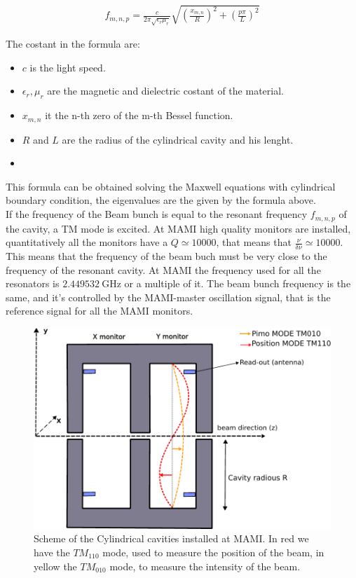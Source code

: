 \begin{align*}
f_{m,n,p} = \frac{c}{2\pi \sqrt{\epsilon_{r} \mu_{r}}} \sqrt{(\frac{x_{m,n}}{R})^{2} + (\frac{p \pi}{L})^{2}}
\end{align*}

The costant in the formula are:

\begin{itemize}
\item $c$ is the light speed.
\item $\epsilon_{r}, \mu_{r}$ are the magnetic and dielectric costant of the material.
\item $x_{m,n}$ it the n-th zero of the m-th Bessel function.
\item $R$ and $L$ are the radius of the cylindrical cavity and his lenght.
\item {}
\end{itemize}

This formula can be obtained solving the Maxwell equations with cylindrical boundary condition, the eigenvalues are the given by the formula above. \\
If the frequency of the Beam bunch is equal to the resonant frequency $f_{m,n,p}$ of the cavity, a TM mode is excited. At MAMI high quality monitors are installed, quantitatively all the monitors have a $Q \simeq 10000$, that means that $\frac{\nu}{\delta \nu} \simeq 10000$. This means that the frequency of the beam buch must be very close to the frequency of the resonant cavity. At MAMI the frequency used for all the resonators is $\SI{2.449532}{\giga \hertz}$ or a multiple of it. The beam bunch frequency is the same, and it's controlled by the MAMI-master oscillation signal, that is the reference signal for all the MAMI monitors.

\begin{figure}[hbtp]
\centering
\includegraphics[width = 0.6 \textwidth]{ExperimentalSetup/Monitors.pdf}
\caption{Scheme of the Cylindrical cavities installed at MAMI. In red we have the $TM_{110}$ mode, used to measure the position of the beam, in yellow the $TM_{010}$ mode, to measure the intensity of the beam.}
\end{figure}

